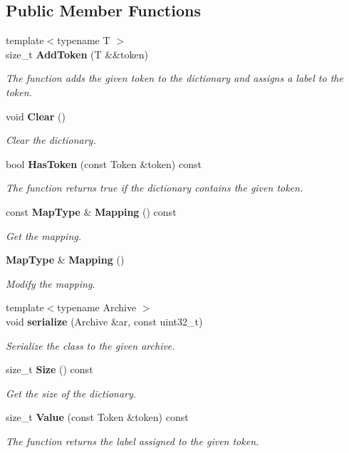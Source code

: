 \subsection*{Public Member Functions}
\begin{DoxyCompactItemize}
\item 
{\footnotesize template$<$typename T $>$ }\\size\+\_\+t \textbf{ Add\+Token} (T \&\&token)
\begin{DoxyCompactList}\small\item\em The function adds the given token to the dictionary and assigns a label to the token. \end{DoxyCompactList}\item 
void \textbf{ Clear} ()
\begin{DoxyCompactList}\small\item\em Clear the dictionary. \end{DoxyCompactList}\item 
bool \textbf{ Has\+Token} (const Token \&token) const
\begin{DoxyCompactList}\small\item\em The function returns true if the dictionary contains the given token. \end{DoxyCompactList}\item 
const \textbf{ Map\+Type} \& \textbf{ Mapping} () const
\begin{DoxyCompactList}\small\item\em Get the mapping. \end{DoxyCompactList}\item 
\textbf{ Map\+Type} \& \textbf{ Mapping} ()
\begin{DoxyCompactList}\small\item\em Modify the mapping. \end{DoxyCompactList}\item 
{\footnotesize template$<$typename Archive $>$ }\\void \textbf{ serialize} (Archive \&ar, const uint32\+\_\+t)
\begin{DoxyCompactList}\small\item\em Serialize the class to the given archive. \end{DoxyCompactList}\item 
size\+\_\+t \textbf{ Size} () const
\begin{DoxyCompactList}\small\item\em Get the size of the dictionary. \end{DoxyCompactList}\item 
size\+\_\+t \textbf{ Value} (const Token \&token) const
\begin{DoxyCompactList}\small\item\em The function returns the label assigned to the given token. \end{DoxyCompactList}\end{DoxyCompactItemize}


